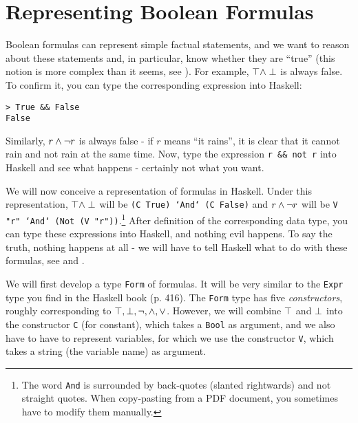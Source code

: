 \documentclass[english]{article}
\begin{document}
\section{Representing Boolean Formulas}

Boolean formulas can represent simple factual statements, and we want to
reason about these statements and, in particular, know whether they are
``true'' (this notion is more complex than it seems, see ).
For example, $\top \land \perp$ is always false. To confirm it, you can type the
corresponding expression into Haskell:

\begin{lstlisting}
> True && False
False
\end{lstlisting}

Similarly, $r \land \lnot r$ is always false - if $r$ means ``it rains'', it is
clear that it cannot rain and not rain at the same time. Now, type the
expression \texttt{r \&\& not r} into Haskell and see what happens - certainly
not what you want.

We will now conceive a representation of formulas in Haskell. Under this
representation, $\top \land \perp$ will be \texttt{(C True) `And` (C False)}
and $r \land \lnot r$ will be \texttt{V "r" `And` (Not (V "r"))}.\footnote{The
  word \texttt{And} is surrounded by back-quotes (slanted rightwards) and not
  straight quotes. When copy-pasting from a PDF document, you sometimes have
  to modify them manually.} After definition of the corresponding data type,
you can type these expressions into Haskell, and nothing evil happens. To say
the truth, nothing happens at all - we will have to tell Haskell what to do
with these formulas, see  and
.

We will first develop a type \texttt{Form} of formulas. It will be very similar
to the \texttt{Expr} type you find in the Haskell book (p. 416). The
\texttt{Form} type has five \emph{constructors}, roughly corresponding to
$\top, \perp, \lnot, \land, \lor$. However, we will combine $\top$ and
$\perp$ into the constructor \texttt{C} (for constant), which takes a
\texttt{Bool} as argument, and we also have to
have to represent variables, for which we use the constructor \texttt{V},
which takes a string (the variable name) as argument. 
\end{document}
